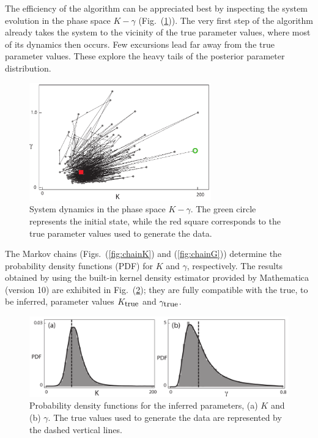 \documentclass[11pt]{article}
\theoremstyle{definition}
\begin{document}
%
The efficiency of the algorithm can be appreciated best by inspecting the system evolution in the phase space $K-\gamma$ (Fig.~(\ref{fig:phase_space_evol})). The very first step of the algorithm already takes the system to the vicinity of the true parameter values, where most of its dynamics then occurs. Few excursions lead far away from the true parameter values. These explore the heavy tails of the posterior parameter distribution.
\begin{figure}[htb!]
    \centering
    \includegraphics[width=0.7\textwidth]{Fig6.pdf}
    \caption{System dynamics in the phase space $K-\gamma$. The green circle represents the initial state, while the red square corresponds to the true parameter values used to generate the data.}
    \label{fig:phase_space_evol}
\end{figure}

The Markov chains (Figs.~(\ref{fig:chainK}) and (\ref{fig:chainG})) determine the probability density functions (PDF) for $K$ and $\gamma$, respectively. The results obtained by using the built-in kernel density estimator provided by Mathematica (version 10) are exhibited in  Fig.~(\ref{fig:KG_distr}); they are fully compatible with the true, to be inferred, parameter values $K_{\mbox{\small true}}$ and $\gamma_{\mbox{\small true}}$.

\begin{figure}[htb!]
    \centering
    \includegraphics[width=1.0\textwidth]{Fig77.pdf}
    \caption{Probability density functions for the inferred parameters, (a) $K$ and  (b) $\gamma$. The true values used to generate the data are represented by the dashed vertical lines.}
    \label{fig:KG_distr}
\end{figure}
\end{document}
